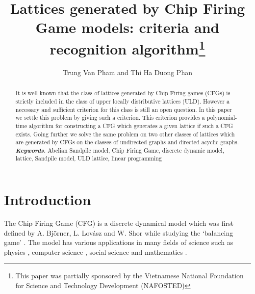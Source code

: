 \documentclass{article}
\theoremstyle{definition}
\begin{document}
\title{Lattices generated by Chip Firing Game models: criteria and recognition algorithm\thanks{This paper was partially sponsored by the Vietnamese National Foundation for Science and Technology Development (NAFOSTED)}} 

\author{Trung Van Pham and Thi Ha Duong Phan}
\maketitle
\begin{abstract}
It is well-known that the class of lattices generated by Chip Firing games (CFGs) is strictly included in the class of upper locally distributive lattices (ULD). However a necessary and sufficient criterion for this class is still an open question. In this paper we settle this problem by giving such a criterion.  This criterion provides a polynomial-time algorithm for constructing a CFG which generates a given lattice if such a CFG exists. Going further we solve the same problem on two other classes of lattices which are generated by CFGs on the classes of undirected graphs and directed acyclic graphs.\\
\hspace{6.ex}\textit{\textbf{Keywords.}} Abelian Sandpile model, Chip Firing Game, discrete dynamic model, lattice, Sandpile model, ULD lattice, linear programming
\end{abstract}
\section{Introduction}
The Chip Firing Game (CFG) is a discrete dynamical model which was first defined by A. Bj\"orner, L. Lov\'asz and W. Shor while studying the `balancing game' \cite{BL92,BLS91,BTW87,S86}. The model has various applications in many fields of science such as physics \cite{DRSV95,BTW87}, computer science \cite{BL92,BLS91,GMP98}, social science \cite{B97,B99} and mathematics \cite{B99,M97,M01}.
\end{document}
